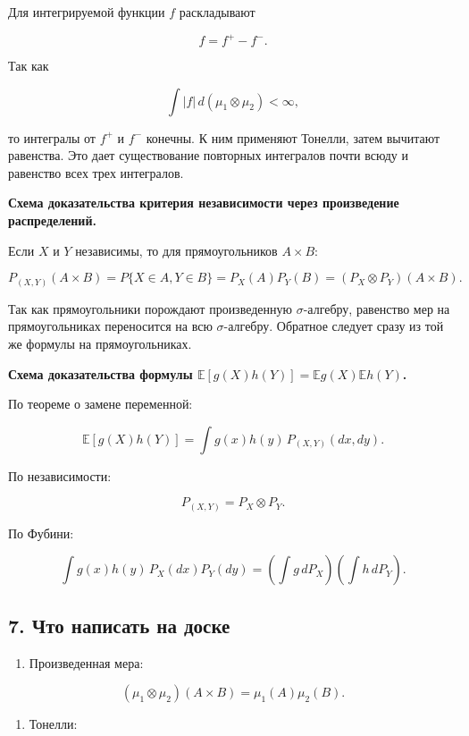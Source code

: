 \documentclass[
  11pt,
  a4paper,
]{article}
\providecommand{\tightlist}{%
  \setlength{\itemsep}{0pt}\setlength{\parskip}{0pt}}
\begin{document}
Для интегрируемой функции \(f\) раскладывают

\[
f=f^+-f^-.
\]

Так как

\[
\int |f|\,d(\mu_1\otimes\mu_2)<\infty,
\]

то интегралы от \(f^+\) и \(f^-\) конечны. К ним применяют Тонелли,
затем вычитают равенства. Это дает существование повторных интегралов
почти всюду и равенство всех трех интегралов.

\textbf{Схема доказательства критерия независимости через произведение
распределений.}

Если \(X\) и \(Y\) независимы, то для прямоугольников \(A\times B\):

\[
P_{(X,Y)}(A\times B)
=
P\{X\in A,Y\in B\}
=
P_X(A)P_Y(B)
=
(P_X\otimes P_Y)(A\times B).
\]

Так как прямоугольники порождают произведенную \(\sigma\)-алгебру,
равенство мер на прямоугольниках переносится на всю \(\sigma\)-алгебру.
Обратное следует сразу из той же формулы на прямоугольниках.

\textbf{Схема доказательства формулы
\(\mathbb E[g(X)h(Y)]=\mathbb E g(X)\mathbb E h(Y)\).}

По теореме о замене переменной:

\[
\mathbb E[g(X)h(Y)]
=
\int g(x)h(y)\,P_{(X,Y)}(dx,dy).
\]

По независимости:

\[
P_{(X,Y)}=P_X\otimes P_Y.
\]

По Фубини:

\[
\int g(x)h(y)\,P_X(dx)P_Y(dy)
=
\left(\int g\,dP_X\right)\left(\int h\,dP_Y\right).
\]

\subsection{7. Что написать на
доске}\label{ux447ux442ux43e-ux43dux430ux43fux438ux441ux430ux442ux44c-ux43dux430-ux434ux43eux441ux43aux435}

\begin{enumerate}
\def\labelenumi{\arabic{enumi}.}
\tightlist
\item
  Произведенная мера:
\end{enumerate}

\[
(\mu_1\otimes\mu_2)(A\times B)=\mu_1(A)\mu_2(B).
\]

\begin{enumerate}
\def\labelenumi{\arabic{enumi}.}
\setcounter{enumi}{1}
\tightlist
\item
  Тонелли:
\end{enumerate}
\end{document}
